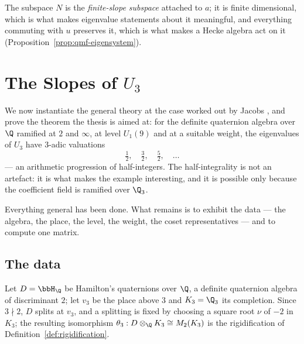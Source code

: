The subspace $N$ is the \emph{finite-slope subspace} attached to $a$; it is finite dimensional,
which is what makes eigenvalue statements about it meaningful, and everything commuting with $u$
preserves it, which is what makes a Hecke algebra act on it (Proposition~\ref{prop:qmf-eigensystem}).



\chapter{The Slopes of $U_3$}
\label{chap:jacobs}

We now instantiate the general theory at the case worked out by Jacobs \cite{Jacobs}, and prove
the theorem the thesis is aimed at: for the definite quaternion algebra over $\Q$ ramified at
$2$ and $\infty$, at level $U_1(9)$ and at a suitable weight, the eigenvalues of $U_3$ have
$3$-adic valuations
\[
  \tfrac12, \quad \tfrac32, \quad \tfrac52, \quad \dots
\]
--- an arithmetic progression of half-integers.  The half-integrality is not an artefact: it is
what makes the example interesting, and it is possible only because the coefficient field is
ramified over $\Q_3$.

Everything general has been done.  What remains is to exhibit the data --- the algebra, the
place, the level, the weight, the coset representatives --- and to compute one matrix.

\section{The data}

\begin{definition}
  \label{def:jacobs-setting}
  \leanok
  Let $D = \bbH_{\Q}$ be Hamilton's quaternions over $\Q$, a definite quaternion algebra of
  discriminant $2$; let $v_3$ be the place above $3$ and $K_3 = \Q_3$ its completion.  Since $3
  \nmid 2$, $D$ splits at $v_3$, and a splitting is fixed by choosing a square root $\nu$ of
  $-2$ in $K_3$; the resulting isomorphism $\theta_3 : D \otimes_{\Q} K_3 \cong M_2(K_3)$ is the
  rigidification of Definition~\ref{def:rigidification}.
\end{definition}

